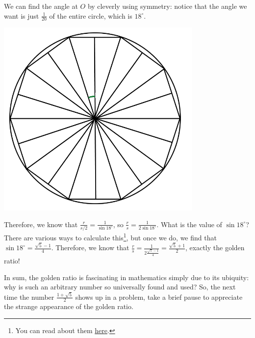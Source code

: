 \documentclass{article}
\begin{document}
We can find the angle at $O$ by cleverly using symmetry: notice that the angle we want is just $\frac1{20}$ of the entire circle, which is $18^\circ$.

\begin{center}
    \includegraphics[width=4in]{images/golden-ratio5.png}
\end{center}

Therefore, we know that $\frac{r}{s/2} = \frac1{\sin 18^\circ}$, so $\frac rs = \frac1{2\sin 18^\circ}$. What is the value of $\sin 18^\circ$? There are various ways to calculate this\footnote{You can read about them \href{https://math.stackexchange.com/questions/2140356/various-methods-to-find-value-of-sin-18-circ}{here}.}, but once we do, we find that $\sin 18^\circ = \frac{\sqrt5-1}4$. Therefore, we know that $\frac rs = \frac1{2\frac{\sqrt5-1}4} = \frac{\sqrt5+1}2$, exactly the golden ratio!

In sum, the golden ratio is fascinating in mathematics simply due to its ubiquity: why is such an arbitrary number so universally found and used? So, the next time the number $\frac{1+\sqrt5}2$ shows up in a problem, take a brief pause to appreciate the strange appearance of the golden ratio.
\end{document}
